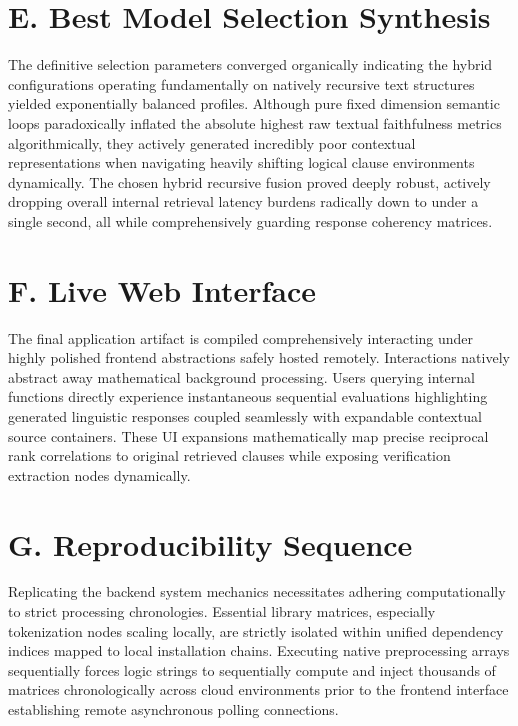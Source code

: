 \documentclass[conference]{IEEEtran}
\begin{document}
\section{E. Best Model Selection Synthesis}
The definitive selection parameters converged organically indicating the hybrid configurations operating fundamentally on natively recursive text structures yielded exponentially balanced profiles. Although pure fixed dimension semantic loops paradoxically inflated the absolute highest raw textual faithfulness metrics algorithmically, they actively generated incredibly poor contextual representations when navigating heavily shifting logical clause environments dynamically. The chosen hybrid recursive fusion proved deeply robust, actively dropping overall internal retrieval latency burdens radically down to under a single second, all while comprehensively guarding response coherency matrices. 

\section{F. Live Web Interface}
The final application artifact is compiled comprehensively interacting under highly polished frontend abstractions safely hosted remotely. Interactions natively abstract away mathematical background processing. Users querying internal functions directly experience instantaneous sequential evaluations highlighting generated linguistic responses coupled seamlessly with expandable contextual source containers. These UI expansions mathematically map precise reciprocal rank correlations to original retrieved clauses while exposing verification extraction nodes dynamically. 

\section{G. Reproducibility Sequence}
Replicating the backend system mechanics necessitates adhering computationally to strict processing chronologies. Essential library matrices, especially tokenization nodes scaling locally, are strictly isolated within unified dependency indices mapped to local installation chains. Executing native preprocessing arrays sequentially forces logic strings to sequentially compute and inject thousands of matrices chronologically across cloud environments prior to the frontend interface establishing remote asynchronous polling connections. 
\end{document}
